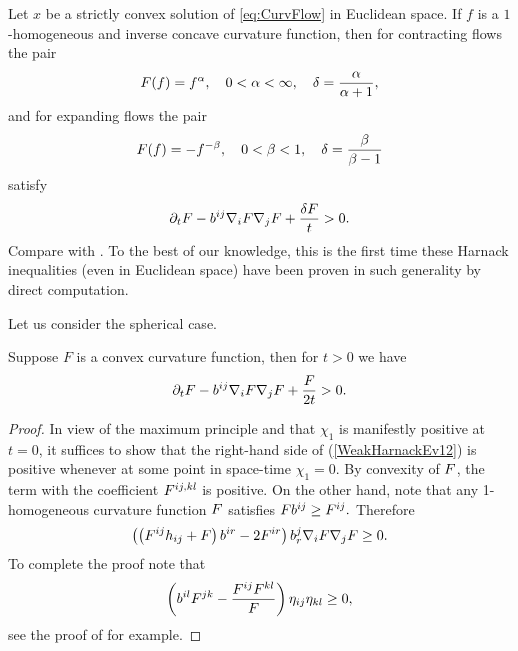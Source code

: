 \documentclass{amsart}
\begin{document}
\begin{remark}\label{HarnackEucCor}
 Let $x$ be a strictly convex solution of \eqref{eq:CurvFlow} in Euclidean space. If $f$ is a $1$-homogeneous and inverse concave curvature function, then for contracting flows the pair
$$F(f)=f^{\alpha},\quad 0<\alpha<\infty, \quad \delta= \frac{\alpha}{\alpha+1},$$
and for expanding flows the pair
$$F(f)=-f^{-\beta}, \quad 0<\beta<1,\quad \delta= \frac{\beta}{\beta-1}$$
satisfy $$\partial_t F-b^{ij}\nabla_iF\nabla_jF+\frac{\delta F}{t}>0.$$
Compare with \cite[Thm.~5.6, Cor.~5.11]{Andrews:09/1994}. To the best of our knowledge, this is the first time these Harnack inequalities (even in Euclidean space) have been proven in such generality by direct computation.
\end{remark}
Let us consider the spherical case.
\begin{theorem}
Suppose $F$ is a  convex curvature function, then for $t>0$ we have
$$\partial_t F-b^{ij}\nabla_iF\nabla_jF+\frac{F}{2t}>0.$$
\end{theorem}
\begin{proof}
In view of the maximum principle and that $\chi_1$ is manifestly positive at $t=0$, it suffices to show that the right-hand side of (\ref{WeakHarnackEv12}) is positive whenever at some point in space-time $\chi_1=0$. By convexity of $F$, the term with the coefficient $F^{ij,kl}$ is positive. On the other hand, note that any 1-homogeneous curvature function $F$ satisfies $F b^{ij}\geq F^{ij}.$ Therefore
$$\left(\left(F^{ij}h_{ij}+F\right)b^{ir}-2F^{ir}\right)b^{j}_{r}\nabla_{i}F\nabla_{j}F\ge 0.$$ To complete the proof note that
$$\left(b^{il}F^{jk}-\frac{F^{ij}F^{kl}}{F}\right)\eta_{ij}\eta_{kl}\geq 0,$$
see the proof of \cite[Theorem 2.3]{Andrews:/2007} for example.
\end{proof}
\end{document}
